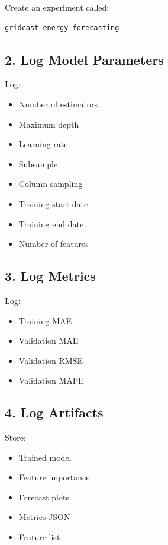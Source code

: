 \documentclass[11pt,a4paper]{article}
\begin{document}
Create an experiment called:

\begin{lstlisting}
gridcast-energy-forecasting
\end{lstlisting}

\subsection{2. Log Model Parameters}

Log:

\begin{itemize}
    \item Number of estimators
    \item Maximum depth
    \item Learning rate
    \item Subsample
    \item Column sampling
    \item Training start date
    \item Training end date
    \item Number of features
\end{itemize}

\subsection{3. Log Metrics}

Log:

\begin{itemize}
    \item Training MAE
    \item Validation MAE
    \item Validation RMSE
    \item Validation MAPE
\end{itemize}

\subsection{4. Log Artifacts}

Store:

\begin{itemize}
    \item Trained model
    \item Feature importance
    \item Forecast plots
    \item Metrics JSON
    \item Feature list
\end{itemize}
\end{document}

